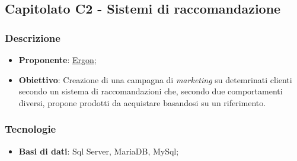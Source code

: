 \subsection{Capitolato C2 - Sistemi di raccomandazione}


\subsubsection{Descrizione}
\begin{itemize}
    \item \textbf{Proponente}: \href{https://www.ergon.it/}{Ergon};
    \item \textbf{Obiettivo}: Creazione di una campagna di \textit{marketing} su detemrinati clienti secondo un sistema di raccomandazioni che, secondo due comportamenti diversi, propone prodotti da acquistare basandosi su un riferimento.
\end{itemize}


\subsubsection{Tecnologie}
\begin{itemize}
    \item \textbf{Basi di dati}: Sql Server, MariaDB, MySql;
\end{itemize}


